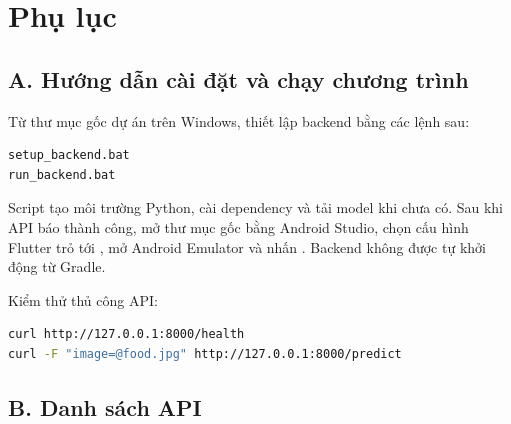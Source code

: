 \chapter{Phụ lục}

\section*{A. Hướng dẫn cài đặt và chạy chương trình}
{}

Từ thư mục gốc dự án trên Windows, thiết lập backend bằng các lệnh sau:

\begin{lstlisting}[language=bash, caption={Thiết lập và chạy backend.}]
setup_backend.bat
run_backend.bat
\end{lstlisting}

Script tạo môi trường Python, cài dependency và tải model khi chưa có. Sau
khi API báo  thành công, mở thư mục gốc bằng Android Studio,
chọn cấu hình Flutter trỏ tới , mở Android Emulator
và nhấn . Backend không được tự khởi động từ Gradle.

Kiểm thử thủ công API:
\begin{lstlisting}[language=bash, caption={Kiểm tra health và nhận diện.}]
curl http://127.0.0.1:8000/health
curl -F "image=@food.jpg" http://127.0.0.1:8000/predict
\end{lstlisting}

\section*{B. Danh sách API}
{}

